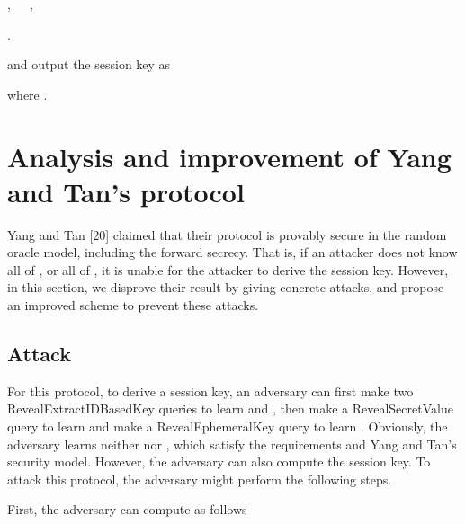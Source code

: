 \documentclass[final,1p,times,twocolumn]{elsarticle}
\begin{document}
,\ \ \  ,\ \ \ \

\vspace{0.1cm}

.

\vspace{0.1cm}

and output the session key as

\vspace{0.1cm}



\vspace{0.1cm}

where .

\vspace{0.3cm}




\section{Analysis and improvement of Yang and Tan's protocol}
\label{4}

Yang and Tan [20] claimed that their protocol is provably secure in the random oracle model, including the forward secrecy. That is, if an attacker does not know all of , or all of , it is unable for the attacker to derive the session key. However, in this section, we disprove their result by giving concrete attacks, and propose an improved scheme to prevent these attacks.

\vspace{0.2cm}

\subsection{Attack}
\label{4.1}

\vspace{0.1cm}

For this protocol, to derive a session key, an adversary can first make two RevealExtractIDBasedKey queries to learn  and , then make a RevealSecretValue query to learn  and make a RevealEphemeralKey query to learn . Obviously, the adversary learns neither   nor , which satisfy the requirements and Yang and Tan's security model. However, the adversary can also compute the session key. To attack this protocol, the adversary might perform the following steps.

\vspace{0.1cm}

First, the adversary can  compute as follows

\vspace{0.1cm}
\end{document}
